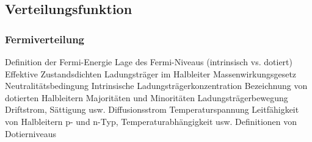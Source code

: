 \subsection{Verteilungsfunktion}
\subsubsection{Fermiverteilung}


Definition der Fermi-Energie
Lage des Fermi-Niveaus (intrinsisch vs. dotiert)
Effektive Zustandsdichten
Ladungsträger im Halbleiter
Massenwirkungsgesetz
Neutralitätsbedingung
Intrinsische Ladungsträgerkonzentration
Bezeichnung von dotierten Halbleitern
Majoritäten und Minoritäten
Ladungsträgerbewegung
Driftstrom, Sättigung usw.
Diffusionsstrom
Temperaturspannung
Leitfähigkeit von Halbleitern
p- und n-Typ, Temperaturabhängigkeit usw.
Definitionen von Dotierniveaus


